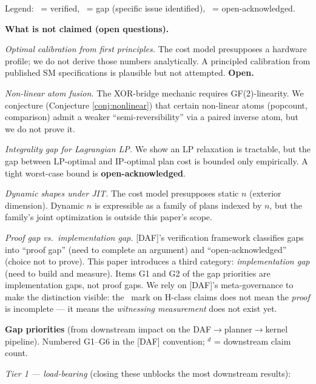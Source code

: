 \noindent Legend: \cmark\ = verified,
\gmark\ = gap (specific issue identified),
\omark\ = open-acknowledged.

\medskip
\noindent\textbf{What is not claimed (open questions).}

\begin{description}[nosep,leftmargin=0.8cm]
  \item[X1] \emph{Optimal calibration from first principles.}
    The cost model presupposes a hardware profile; we do
    not derive those numbers analytically. A principled
    calibration from published SM specifications is
    plausible but not attempted. \textbf{Open.}
  \item[X2] \emph{Non-linear atom fusion.}
    The XOR-bridge mechanic requires GF(2)-linearity.
    We conjecture (Conjecture \ref{conj:nonlinear}) that
    certain non-linear atoms (popcount, comparison)
    admit a weaker ``semi-reversibility'' via a paired
    inverse atom, but we do not prove it.
  \item[X3] \emph{Integrality gap for Lagrangian LP.}
    We show an LP relaxation is tractable, but the
    gap between LP-optimal and IP-optimal plan cost
    is bounded only empirically. A tight worst-case
    bound is \textbf{open-acknowledged}.
  \item[X4] \emph{Dynamic shapes under JIT.}
    The cost model presupposes static $n$ (exterior
    dimension). Dynamic $n$ is expressible as a
    family of plans indexed by $n$, but the family's
    joint optimization is outside this paper's scope.
  \item[X5] \emph{Proof gap vs.\ implementation gap.}
    [DAF]'s verification framework classifies gaps
    into ``proof gap'' (need to complete an argument)
    and ``open-acknowledged'' (choice not to prove).
    This paper introduces a third category:
    \emph{implementation gap} (need to build and
    measure). Items G1 and G2 of the gap priorities
    are implementation gaps, not proof gaps. We rely
    on [DAF]'s meta-governance to make the
    distinction visible: the \gmark\ mark on \textsf{H}-class
    claims does not mean the \emph{proof} is incomplete
    --- it means the \emph{witnessing measurement}
    does not exist yet.
\end{description}

\medskip
\noindent\textbf{Gap priorities} (from downstream
impact on the DAF$\to$planner$\to$kernel pipeline).
Numbered G1--G6 in the [DAF] convention; $^d$ = downstream
claim count.

\emph{Tier 1 --- load-bearing}
(closing these unblocks the most downstream results):

